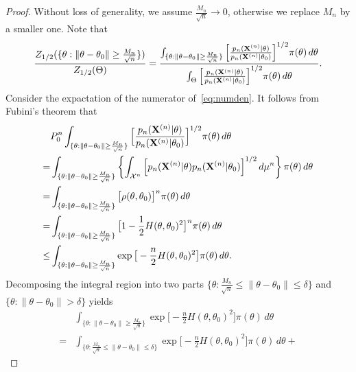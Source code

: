 \documentclass[3p]{elsarticle}
\theoremstyle{plain}
\theoremstyle{definition}
\theoremstyle{remark}
\begin{document}
\begin{proof}
    Without loss of generality, we assume $\frac{M_n}{\sqrt{n}}\to 0$, otherwise we replace $M_n$ by a smaller one.
    Note that
       \begin{equation}\label{eq:numden}
       \frac{Z_{1/2} ( 
       \{\theta: \|\theta-\theta_0\|\geq \frac{M_n}{\sqrt{n}}\})}{Z_{1/2}(\Theta)}
=
    \frac{
        \int_{\{\theta: \|\theta-\theta_0\|\geq \frac{M_n}{\sqrt{n}}\}} \Big[ \frac{p_n(\mathbf{X}^{(n)}|\theta)}{p_n(\mathbf{X}^{(n)}|\theta_0)} \Big]^{1/2} \pi(\theta) \, d \theta
    }{
        \int_{\Theta} \Big[ \frac{p_n(\mathbf{X}^{(n)}|\theta)}{p_n(\mathbf{X}^{(n)}|\theta_0)} \Big]^{1/2} \pi(\theta) \, d \theta
    }.
       \end{equation}
    Consider the expactation of the numerator of~\ref{eq:numden}. It follows from Fubini's theorem that
    $$
    \begin{aligned}
        &P_0^n\int_{\{\theta:\|\theta-\theta_0\|\geq \frac{M_n}{\sqrt{n}}\} } \Big[ \frac{p_n(\BX^{(n)}|\theta)}{p_n(\BX^{(n)}|\theta_0)}  \Big]^{1/2} \pi(\theta) \, d \theta
        \\
        =&
        \int_{\{\theta:\|\theta-\theta_0\|\geq \frac{M_n}{\sqrt{n}}\} } \left\{\int_{\mathcal{X}^n}\Big[ {p_n} (\BX^{(n)}|\theta)  p_n (\BX^{(n)}|\theta_0) \Big]^{1/2} \, d\mu^n \right\} \pi(\theta) \, d \theta\\
        =&
        \int_{\{\theta:\|\theta-\theta_0\|\geq \frac{M_n}{\sqrt{n}}\} } \big[ \rho(\theta,\theta_0) \big]^n \pi(\theta) \, d \theta\\
        =&
        \int_{\{\theta:\|\theta-\theta_0\|\geq \frac{M_n}{\sqrt{n}}\} } \big[ 1-\frac{1}{2}H(\theta,\theta_0)^2 \big]^n \pi(\theta) \, d \theta\\
        \leq &
        \int_{\{\theta:\|\theta-\theta_0\|\geq \frac{M_n}{\sqrt{n}}\} } \exp \big[ -\frac{n}{2}H(\theta,\theta_0)^2 \big] \pi(\theta) \, d \theta.
    \end{aligned}
    $$
    Decomposing the integral region into two parts $\{\theta:\frac{M_n}{\sqrt{n}}\leq \|\theta-\theta_0\|\leq \delta \}$ and $\{\theta: \|\theta-\theta_0\|>\delta\}$ yields
    $$
    \begin{aligned}
        &\int_{\{\theta:\|\theta-\theta_0\|\geq \frac{M_n}{\sqrt{n}}\} } \exp \big[ -\frac{n}{2}H(\theta,\theta_0)^2 \big] \pi(\theta) \, d \theta
        \\
        =&\int_{\{\theta:\frac{M_n}{\sqrt{n}}\leq \|\theta-\theta_0\|\leq \delta \}} \exp \big[ -\frac{n}{2}H(\theta,\theta_0)^2 \big] \pi(\theta) \, d \theta+

\end{aligned}$$
\end{proof}
\end{document}
